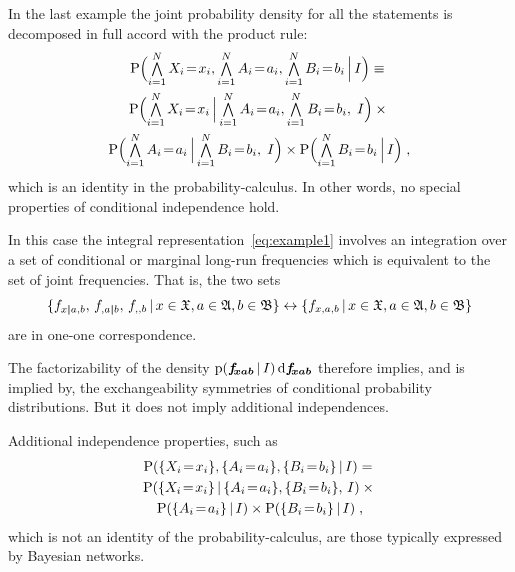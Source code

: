 \documentclass[\ifafour a4paper,12pt,\else a5paper,10pt,\fi%
onecolumn,oneside,article,%
british%
]{memoir}
\theoremstyle{remark}
\theoremstyle{innote}
\newcommand*{\di}{\mathrm{d}}%
\newcommand*{\Land}{\mathop{\textstyle\bigwedge}}
\DeclarePairedDelimiter\set{\{}{\}}
\newcommand*{\pf}{\mathrm{p}}%
\newcommand*{\p}{\mathrm{P}}%
\renewcommand*{\|}[1][]{\nonscript\,#1\vert\nonscript\,\mathopen{}}
\renewcommand*{\=}{\TextOrMath\texteq\eq}
\newcommand*{\X}[1]{X_{#1}}
\newcommand*{\x}[1]{x_{#1}}
\newcommand*{\A}[1]{A_{#1}}
\newcommand*{\va}[1]{a_{#1}}
\newcommand*{\B}[1]{B_{#1}}
\newcommand*{\vb}[1]{b_{#1}}
\newcommand*{\sX}{\mathfrak{X}}
\newcommand*{\sA}{\mathfrak{A}}
\newcommand*{\sB}{\mathfrak{B}}
\newcommand*{\ff}[1]{f_{#1}}
\newcommand*{\ffb}[1]{\bm{f_{\!#1}}}
\newcommand*{\bcond}[1][]{\nonscript\,#1\bm{\vert}\nonscript\;\mathopen{}}
\begin{document}
In the last example the joint probability density for all the statements is
decomposed in full accord with the product rule:
\begin{multline}
  \label{eq:example_usual_factorization}
  \p\Bigl( \Land_{i=1}^{N}\X{i}\=\x{i},  \Land_{i=1}^{N}\A{i}\=\va{i},
  \Land_{i=1}^{N}\B{i}\=\vb{i} \|[\Big] I\Bigr)  \equiv{}\\
  \p\Bigl( \Land_{i=1}^{N}\X{i}\=\x{i} \|[\Big]  \Land_{i=1}^{N}\A{i}\=\va{i},
  \Land_{i=1}^{N}\B{i}\=\vb{i},\;  I\Bigr) \times{}\\
  \p\Bigl( \Land_{i=1}^{N}\A{i}\=\va{i} \|[\Big]
  \Land_{i=1}^{N}\B{i}\=\vb{i},\; I\Bigr) \times
  \p\Bigl( \Land_{i=1}^{N}\B{i}\=\vb{i} \|[\Big]  I\Bigr)
  \;,
\end{multline}
which is an identity in the probability-calculus. In other words, no
special properties of conditional independence hold.

In this case the integral representation~\eqref{eq:example1} involves an
integration over a set of conditional or marginal long-run frequencies
which is equivalent to the set of joint frequencies. That is, the two sets
\begin{equation}
  \label{eq:sets_corr}
  \set{\ff{x \bcond a,b},\, \ff{,a \bcond b},\, \ff{,,b} \|
 x \in \sX, a \in \sA, b \in \sB}
\leftrightarrow
\set{\ff{x,a,b} \| x \in \sX, a \in \sA, b \in \sB}
\end{equation}
are in one-one correspondence.

The factorizability of the density $\pf(\ffb{xab}\|I)\,\di\ffb{xab}$
therefore implies, and is implied by, the exchangeability symmetries of
conditional probability distributions. But it does not imply additional
independences.

Additional independence properties, such as
\begin{multline}
  \label{eq:example_independence}
  \p( \set{\X{i}\=\x{i}}, \set{\A{i}\=\va{i}}, \set{\B{i}\=\vb{i}} \| I)
={}\\
  \p( \set{\X{i}\=\x{i}} \| \set{\A{i}\=\va{i}}, \set{\B{i}\=\vb{i}},\, I)
  \times{}\\
  \p(\set{\A{i}\=\va{i}} \|  I)
  \times \p(  \set{\B{i}\=\vb{i}}\| I) \;,
\end{multline}
which is not an identity of the probability-calculus, are those typically
expressed by Bayesian networks.
\end{document}
